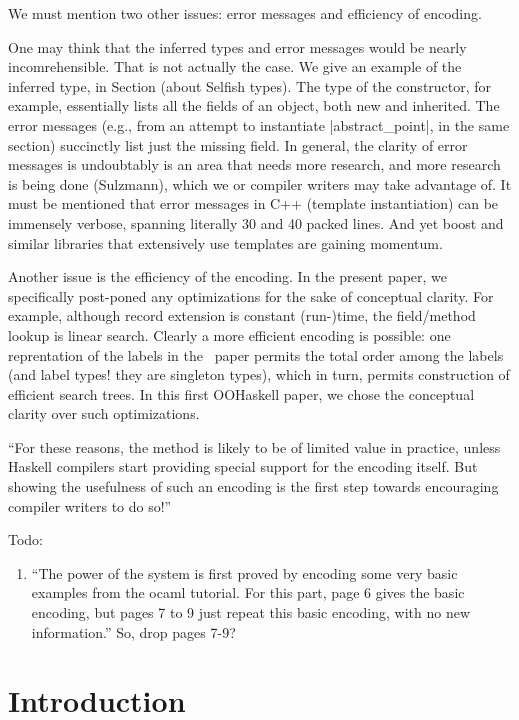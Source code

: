 We must mention two other issues: error messages and efficiency of
encoding.

One may think that the inferred types and error messages
would be nearly incomrehensible. That is not actually the case.
We give an example of the inferred type, in Section (about Selfish
types). The type of the constructor, for example, 
essentially lists all the fields of an object, both new and
inherited. The error messages (e.g., from an attempt to instantiate
|abstract_point|, in the same section) succinctly list just the
missing field. In general, the clarity of error messages is undoubtably
is an area that needs more research, and more research is
being done (Sulzmann), which we or compiler writers may take advantage
of. It must be mentioned that error messages in C++ (template
instantiation) can be immensely
verbose, spanning literally 30 and 40 packed lines. And yet boost and
similar libraries that extensively use templates are gaining momentum.

Another issue is the efficiency of the encoding.  In the present
paper, we specifically post-poned any optimizations for the sake of
conceptual clarity.  For example, although record extension is
constant (run-)time, the field/method lookup is linear search. Clearly
a more efficient encoding is possible: one reprentation of the labels
in the \HList\ paper permits the total order among the labels (and label
types! they are singleton types), which in turn, permits construction
of efficient search trees. In this first OOHaskell paper, we chose the
conceptual clarity over such optimizations.


``For these reasons, the method is likely to be of limited value in
practice, unless Haskell compilers start providing special support for
the encoding itself. But showing the usefulness of such an encoding is
the first step towards encouraging compiler writers to do so!''




Todo: 
\begin{enumerate}
\item ``The power of the system is first proved by encoding some very basic
examples from the ocaml tutorial. For this part, page 6 gives the basic
encoding, but pages 7 to 9 just repeat this basic encoding, with no
new information.''
So, drop pages 7-9?
\end{enumerate}



\section{Introduction}

